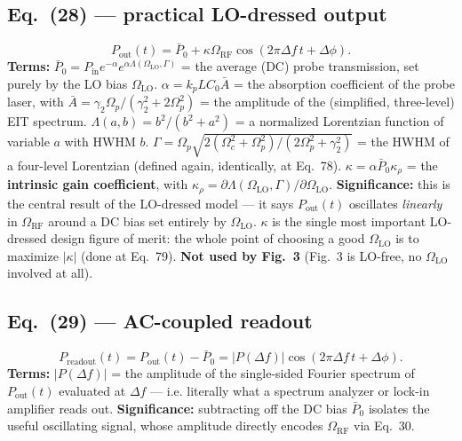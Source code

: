 \documentclass[11pt]{article}
\begin{document}
\subsection*{Eq.~(28) --- practical LO-dressed output}
\begin{equation}
P_\text{out}(t) = \bar P_0 + \kappa\Omega_\text{RF}\cos(2\pi\Delta f\,t+\Delta\phi). \tag{28}
\end{equation}
\textbf{Terms:} $\bar P_0=P_\text{in}e^{-\alpha}e^{\alpha\Lambda(\Omega_\text{LO},\Gamma)}$
= the average (DC) probe transmission, set purely by the LO bias
$\Omega_\text{LO}$. $\alpha=k_pLC_0\bar A$ = the absorption coefficient
of the probe laser, with $\bar A=\gamma_2\Omega_p/(\gamma_2^2+2\Omega_p^2)$
= the amplitude of the (simplified, three-level) EIT spectrum.
$\Lambda(a,b)=b^2/(b^2+a^2)$ = a normalized Lorentzian function of
variable $a$ with HWHM $b$. $\Gamma=\Omega_p\sqrt{2(\Omega_c^2+\Omega_p^2)/(2\Omega_p^2+\gamma_2^2)}$
= the HWHM of a four-level Lorentzian (defined again, identically, at
Eq.~78). $\kappa=\alpha\bar P_0\kappa_\rho$ = the \textbf{intrinsic gain
coefficient}, with $\kappa_\rho=\partial\Lambda(\Omega_\text{LO},\Gamma)/\partial\Omega_\text{LO}$.
\textbf{Significance:} this is the central result of the LO-dressed
model --- it says $P_\text{out}(t)$ oscillates \emph{linearly} in
$\Omega_\text{RF}$ around a DC bias set entirely by $\Omega_\text{LO}$.
$\kappa$ is the single most important LO-dressed design figure of
merit: the whole point of choosing a good $\Omega_\text{LO}$ is to
maximize $|\kappa|$ (done at Eq.~79). \textbf{Not used by Fig.~3}
(Fig.~3 is LO-free, no $\Omega_\text{LO}$ involved at all).

\subsection*{Eq.~(29) --- AC-coupled readout}
\begin{equation}
P_\text{readout}(t)=P_\text{out}(t)-\bar P_0 = |P(\Delta f)|\cos(2\pi\Delta f\,t+\Delta\phi). \tag{29}
\end{equation}
\textbf{Terms:} $|P(\Delta f)|$ = the amplitude of the single-sided
Fourier spectrum of $P_\text{out}(t)$ evaluated at $\Delta f$ --- i.e.
literally what a spectrum analyzer or lock-in amplifier reads out.
\textbf{Significance:} subtracting off the DC bias $\bar P_0$ isolates
the useful oscillating signal, whose amplitude directly encodes
$\Omega_\text{RF}$ via Eq.~30.
\end{document}
